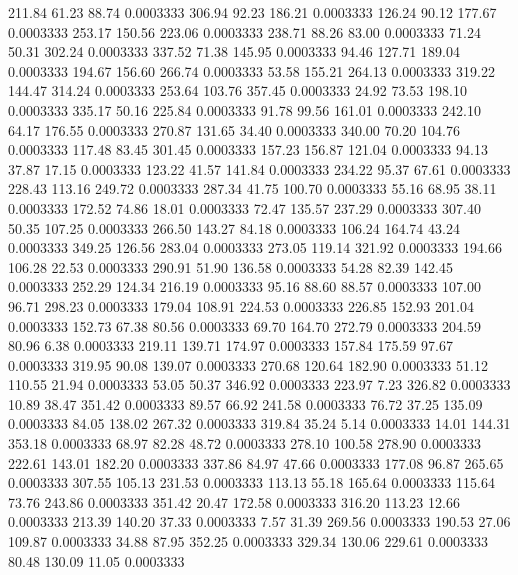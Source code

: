  211.84   61.23   88.74   0.0003333
 306.94   92.23  186.21   0.0003333
 126.24   90.12  177.67   0.0003333
 253.17  150.56  223.06   0.0003333
 238.71   88.26   83.00   0.0003333
  71.24   50.31  302.24   0.0003333
 337.52   71.38  145.95   0.0003333
  94.46  127.71  189.04   0.0003333
 194.67  156.60  266.74   0.0003333
  53.58  155.21  264.13   0.0003333
 319.22  144.47  314.24   0.0003333
 253.64  103.76  357.45   0.0003333
  24.92   73.53  198.10   0.0003333
 335.17   50.16  225.84   0.0003333
  91.78   99.56  161.01   0.0003333
 242.10   64.17  176.55   0.0003333
 270.87  131.65   34.40   0.0003333
 340.00   70.20  104.76   0.0003333
 117.48   83.45  301.45   0.0003333
 157.23  156.87  121.04   0.0003333
  94.13   37.87   17.15   0.0003333
 123.22   41.57  141.84   0.0003333
 234.22   95.37   67.61   0.0003333
 228.43  113.16  249.72   0.0003333
 287.34   41.75  100.70   0.0003333
  55.16   68.95   38.11   0.0003333
 172.52   74.86   18.01   0.0003333
  72.47  135.57  237.29   0.0003333
 307.40   50.35  107.25   0.0003333
 266.50  143.27   84.18   0.0003333
 106.24  164.74   43.24   0.0003333
 349.25  126.56  283.04   0.0003333
 273.05  119.14  321.92   0.0003333
 194.66  106.28   22.53   0.0003333
 290.91   51.90  136.58   0.0003333
  54.28   82.39  142.45   0.0003333
 252.29  124.34  216.19   0.0003333
  95.16   88.60   88.57   0.0003333
 107.00   96.71  298.23   0.0003333
 179.04  108.91  224.53   0.0003333
 226.85  152.93  201.04   0.0003333
 152.73   67.38   80.56   0.0003333
  69.70  164.70  272.79   0.0003333
 204.59   80.96    6.38   0.0003333
 219.11  139.71  174.97   0.0003333
 157.84  175.59   97.67   0.0003333
 319.95   90.08  139.07   0.0003333
 270.68  120.64  182.90   0.0003333
  51.12  110.55   21.94   0.0003333
  53.05   50.37  346.92   0.0003333
 223.97    7.23  326.82   0.0003333
  10.89   38.47  351.42   0.0003333
  89.57   66.92  241.58   0.0003333
  76.72   37.25  135.09   0.0003333
  84.05  138.02  267.32   0.0003333
 319.84   35.24    5.14   0.0003333
  14.01  144.31  353.18   0.0003333
  68.97   82.28   48.72   0.0003333
 278.10  100.58  278.90   0.0003333
 222.61  143.01  182.20   0.0003333
 337.86   84.97   47.66   0.0003333
 177.08   96.87  265.65   0.0003333
 307.55  105.13  231.53   0.0003333
 113.13   55.18  165.64   0.0003333
 115.64   73.76  243.86   0.0003333
 351.42   20.47  172.58   0.0003333
 316.20  113.23   12.66   0.0003333
 213.39  140.20   37.33   0.0003333
   7.57   31.39  269.56   0.0003333
 190.53   27.06  109.87   0.0003333
  34.88   87.95  352.25   0.0003333
 329.34  130.06  229.61   0.0003333
  80.48  130.09   11.05   0.0003333
